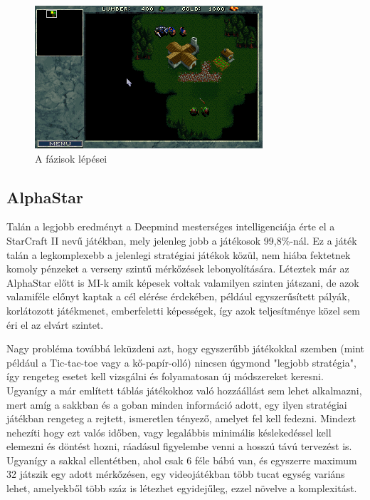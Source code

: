 \begin{figure}[h]
    \centering
    \includegraphics[scale=1]{images/wc.png}
    \caption{A fázisok lépései}
    \label{fig:warcraft}
\end{figure}

\subsection{AlphaStar}
Talán a legjobb eredményt a Deepmind mesterséges intelligenciája érte el a StarCraft II nevű játékban, mely jelenleg jobb a játékosok 99,8\%-nál{\cite{deepmind}}. 
Ez a játék talán a legkomplexebb a jelenlegi stratégiai játékok közül, nem hiába fektetnek komoly pénzeket a verseny szintű mérkőzések lebonyolítására.
Léteztek már az AlphaStar előtt is MI-k amik képesek voltak valamilyen szinten játszani, de azok valamiféle előnyt kaptak a cél elérése érdekében, például egyszerűsített pályák, korlátozott játékmenet, emberfeletti képességek, így azok teljesítménye közel sem éri el az elvárt szintet.

Nagy probléma továbbá leküzdeni azt, hogy egyszerűbb játékokkal szemben (mint például a Tic-tac-toe vagy a kő-papír-olló) nincsen úgymond "legjobb stratégia", így rengeteg esetet kell vizsgálni és folyamatosan új módszereket keresni. Ugyanígy a már említett táblás játékokhoz való hozzáállást sem lehet alkalmazni, mert amíg a sakkban és a goban minden információ adott, egy ilyen stratégiai játékban rengeteg a rejtett, ismeretlen tényező, amelyet fel kell fedezni. Mindezt nehezíti hogy ezt valós időben, vagy legalábbis minimális késlekedéssel kell elemezni és döntést hozni, ráadásul figyelembe venni a hosszú távú tervezést is. Ugyanígy a sakkal ellentétben, ahol csak 6 féle bábú van, és egyszerre maximum 32 játszik egy adott mérkőzésen, egy videojátékban több tucat egység variáns lehet, amelyekből több száz is létezhet egyidejűleg, ezzel növelve a komplexitást.


